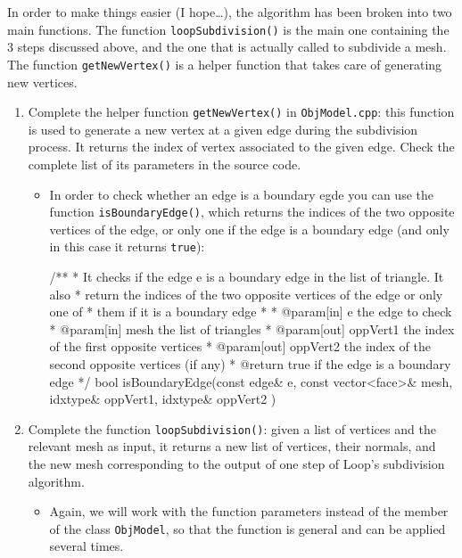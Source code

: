 \documentclass[a4paper,11pt]{article}
\newcommand{\hilight}[1]{\colorbox{bg}{#1}}
\newcommand{\coden}[1]{\texttt{#1}}
\newcommand{\code}[1]{\hilight{\texttt{#1}}}
\begin{document}
In order to make things easier (I hope\ldots), the algorithm has been broken into two main functions. The function \code{loopSubdivision()} is the main one containing the 3 steps discussed above, and the one that is actually called to subdivide a mesh. The function \code{getNewVertex()} is a helper function that takes care of generating new vertices. 

\begin{enumerate}
    \item Complete the helper function \code{getNewVertex()} in \coden{ObjModel.cpp}: this function is used to generate a new vertex at a given edge during the subdivision process. It returns the index of vertex associated to the given edge. Check the complete list of its parameters in the source code. 
    \begin{itemize}
        \item In order to check whether an edge is a boundary egde you can use the function \code{isBoundaryEdge()}, which returns the indices of the two opposite vertices of the edge, or only one if the edge is a boundary edge (and only in this case it returns \coden{true}):

{\smaller[2]
\begin{cppcode}
/**
 * It checks if the edge e is a boundary edge in the list of triangle. It also 
 * return the indices of the two opposite vertices of the edge or only one of 
 * them if it is a boundary edge
 * 
 * @param[in] e the edge to check
 * @param[in] mesh the list of triangles
 * @param[out] oppVert1 the index of the first opposite vertices 
 * @param[out] oppVert2 the index of the second opposite vertices (if any)
 * @return true if the edge is a boundary edge
 */
bool isBoundaryEdge(const edge& e, const vector<face>& mesh, idxtype& oppVert1, idxtype& oppVert2 )
\end{cppcode}    
}

    \end{itemize}
    \item Complete the function \code{loopSubdivision()}: given a list of vertices and the relevant mesh as input, it returns a new list of vertices, their normals, and the new mesh corresponding to the output of one step of Loop's subdivision algorithm. 

    \begin{itemize}
        \item Again, we will work with the function parameters instead of the member of the class \coden{ObjModel}, so that the function is general and can be applied several times.


\end{itemize}
\end{enumerate}
\end{document}
